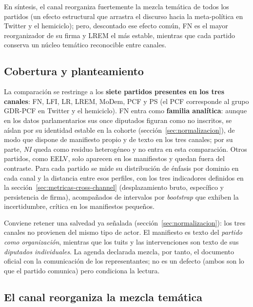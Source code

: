 En síntesis, el canal reorganiza fuertemente la mezcla temática de todos los
partidos (un efecto estructural que arrastra el discurso hacia la meta-política
en Twitter y el hemiciclo); pero, descontado ese efecto común, FN es el mayor
reorganizador de su firma y LREM el más estable, mientras que cada partido
conserva un núcleo temático reconocible entre canales.

\subsection{Cobertura y planteamiento}
\label{sec:res-declarada-cobertura}

La comparación se restringe a los \textbf{siete partidos presentes en los tres
canales}: FN, LFI, LR, LREM, MoDem, PCF y PS (el PCF corresponde al grupo GDR-PCF
en Twitter y el hemiciclo). FN entra como \textbf{familia analítica}: aunque en
los datos parlamentarios sus once diputados figuran como no inscritos, se aíslan
por su identidad estable en la cohorte (sección~\ref{sec:normalizacion}), de modo
que dispone de manifiesto propio y de texto en los tres canales; por su parte,
\emph{NI} queda como residuo heterogéneo y no entra en esta comparación. Otros
partidos, como EELV, solo aparecen en los manifiestos y quedan fuera del
contraste. Para cada partido se mide su distribución de énfasis por dominio en
cada canal y la distancia entre esos perfiles, con los tres indicadores definidos
en la sección~\ref{sec:metricas-cross-channel} (desplazamiento bruto, específico
y persistencia de firma), acompañados de intervalos por \emph{bootstrap} que
exhiben la incertidumbre, crítica en los manifiestos pequeños.

Conviene retener una salvedad ya señalada (sección~\ref{sec:normalizacion}): los
tres canales no provienen del mismo tipo de actor. El manifiesto es texto del
\emph{partido como organización}, mientras que los tuits y las intervenciones son
texto de sus \emph{diputados individuales}. La agenda declarada mezcla, por tanto,
el documento oficial con la comunicación de los representantes; no es un defecto
(ambos son lo que el partido comunica) pero condiciona la lectura.

\subsection{El canal reorganiza la mezcla temática}
\label{sec:res-declarada-patron}

